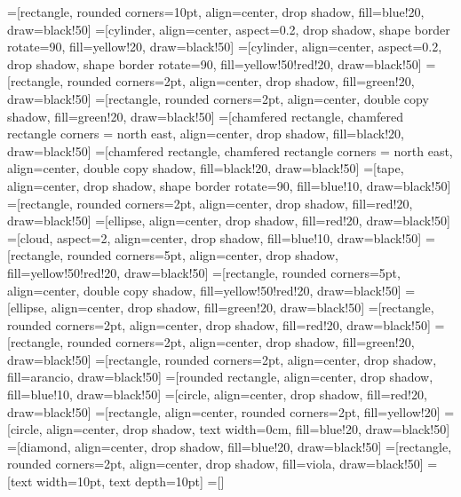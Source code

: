 
=[rectangle, rounded corners=10pt, align=center, drop shadow, fill=blue!20, draw=black!50]
=[cylinder, align=center, aspect=0.2, drop shadow, shape border rotate=90, fill=yellow!20, draw=black!50]
=[cylinder, align=center, aspect=0.2, drop shadow, shape border rotate=90, fill=yellow!50!red!20, draw=black!50]
=[rectangle, rounded corners=2pt, align=center, drop shadow, fill=green!20, draw=black!50]
=[rectangle, rounded corners=2pt, align=center, double copy shadow, fill=green!20, draw=black!50]
=[chamfered rectangle, chamfered rectangle corners = north east, align=center, drop shadow, fill=black!20, draw=black!50]
=[chamfered rectangle, chamfered rectangle corners = north east, align=center, double copy shadow, fill=black!20, draw=black!50]
=[tape, align=center, drop shadow, shape border rotate=90, fill=blue!10, draw=black!50]
=[rectangle, rounded corners=2pt, align=center, drop shadow, fill=red!20, draw=black!50]
=[ellipse, align=center, drop shadow, fill=red!20, draw=black!50]
=[cloud, aspect=2, align=center, drop shadow, fill=blue!10, draw=black!50]
=[rectangle, rounded corners=5pt, align=center, drop shadow, fill=yellow!50!red!20, draw=black!50]
=[rectangle, rounded corners=5pt, align=center, double copy shadow, fill=yellow!50!red!20, draw=black!50]
=[ellipse, align=center, drop shadow, fill=green!20, draw=black!50]
=[rectangle, rounded corners=2pt, align=center, drop shadow, fill=red!20, draw=black!50]
=[rectangle, rounded corners=2pt, align=center, drop shadow, fill=green!20, draw=black!50]
=[rectangle, rounded corners=2pt, align=center, drop shadow, fill=arancio, draw=black!50]
=[rounded rectangle, align=center, drop shadow, fill=blue!10, draw=black!50]
=[circle, align=center, drop shadow, fill=red!20, draw=black!50]
=[rectangle, align=center, rounded corners=2pt, fill=yellow!20]
=[circle, align=center, drop shadow, text width=0cm, fill=blue!20, draw=black!50]
=[diamond, align=center, drop shadow, fill=blue!20, draw=black!50]
=[rectangle, rounded corners=2pt, align=center, drop shadow, fill=viola, draw=black!50]
=[text width=10pt, text depth=10pt]
=[]

